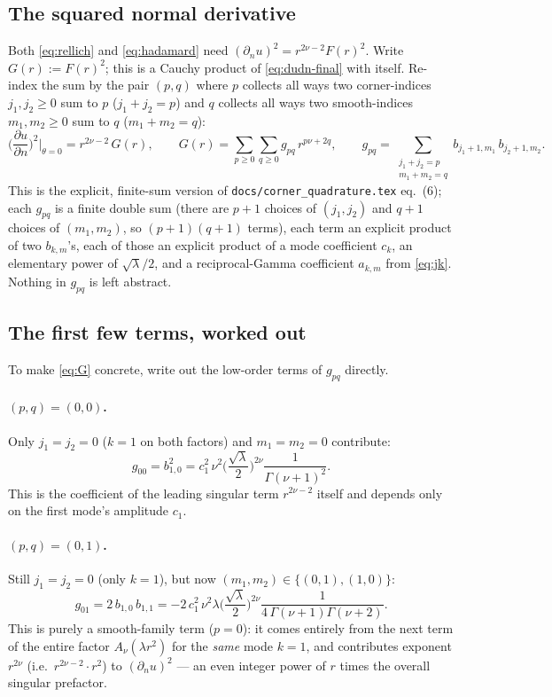 \documentclass[11pt]{article}
\theoremstyle{remark}
\newcommand{\pdn}[1]{\frac{\partial #1}{\partial n}}
\newcommand{\code}[1]{\texttt{#1}}
\begin{document}
\subsection{The squared normal derivative}

Both \eqref{eq:rellich} and \eqref{eq:hadamard} need $(\partial_n u)^2 = r^{2\nu-2}F(r)^2$. Write
$G(r) := F(r)^2$; this is a Cauchy product of \eqref{eq:dudn-final} with itself. Re-index the sum
by the pair $(p,q)$ where $p$ collects all ways two corner-indices $j_1,j_2\ge0$ sum to $p$
($j_1+j_2=p$) and $q$ collects all ways two smooth-indices $m_1,m_2\ge0$ sum to $q$
($m_1+m_2=q$):
\begin{equation}\label{eq:G}
  \big(\pdn u\big)^{\!2}\bigg|_{\theta=0} = r^{2\nu-2}\,G(r),
  \qquad
  G(r) = \sum_{p\ge0}\sum_{q\ge0} g_{pq}\, r^{p\nu+2q},
  \qquad
  g_{pq} = \sum_{\substack{j_1+j_2=p\\ m_1+m_2=q}} b_{j_1+1,m_1}\,b_{j_2+1,m_2}.
\end{equation}
This is the explicit, finite-sum version of \code{docs/corner\_quadrature.tex} eq.~(6); each
$g_{pq}$ is a finite double sum (there are $p+1$ choices of $(j_1,j_2)$ and $q+1$ choices of
$(m_1,m_2)$, so $(p+1)(q+1)$ terms), each term an explicit product of two $b_{k,m}$'s, each of
those an explicit product of a mode coefficient $c_k$, an elementary power of $\sqrt\lambda/2$,
and a reciprocal-Gamma coefficient $a_{k,m}$ from \eqref{eq:jk}. Nothing in $g_{pq}$ is left
abstract.

\subsection{The first few terms, worked out}

To make \eqref{eq:G} concrete, write out the low-order terms of $g_{pq}$ directly.

\paragraph{$(p,q)=(0,0)$.} Only $j_1=j_2=0$ ($k=1$ on both factors) and $m_1=m_2=0$ contribute:
\[
  g_{00} = b_{1,0}^2 = c_1^2\,\nu^2\Big(\frac{\sqrt\lambda}2\Big)^{2\nu}\!\frac{1}{\Gamma(\nu+1)^2}.
\]
This is the coefficient of the leading singular term $r^{2\nu-2}$ itself and depends only on the
first mode's amplitude $c_1$.

\paragraph{$(p,q)=(0,1)$.} Still $j_1=j_2=0$ (only $k=1$), but now $(m_1,m_2)\in\{(0,1),(1,0)\}$:
\[
  g_{01} = 2\,b_{1,0}\,b_{1,1}
  = -2\,c_1^2\,\nu^2\lambda\Big(\frac{\sqrt\lambda}2\Big)^{2\nu}\!
    \frac{1}{4\,\Gamma(\nu+1)\Gamma(\nu+2)}.
\]
This is purely a smooth-family term ($p=0$): it comes entirely from the next term of the entire
factor $A_\nu(\lambda r^2)$ for the \emph{same} mode $k=1$, and contributes exponent $r^{2\nu}$
(i.e.\ $r^{2\nu-2}\cdot r^2$) to $(\partial_n u)^2$ --- an even integer power of $r$ times the
overall singular prefactor.
\end{document}

